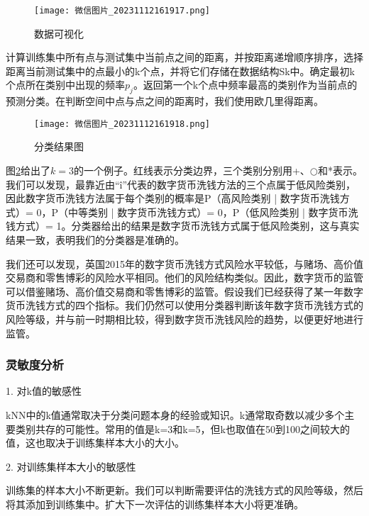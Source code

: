 \documentclass[withoutpreface,bwprint]{cumcmthesis} %
\begin{document}
\begin{figure}[htfp]  %
	\centering  %
	\label{pic3}
	\texttt{[image: 微信图片\_20231112161917.png]} %
	\caption{数据可视化} %
\end{figure}

计算训练集中所有点与测试集中当前点之间的距离，并按距离递增顺序排序，选择距离当前测试集中的点最小的k个点，并将它们存储在数据结构Sk中。确定最初k个点所在类别中出现的频率$p_j$。返回第一个k个点中频率最高的类别作为当前点的预测分类。在判断空间中点与点之间的距离时，我们使用欧几里得距离。

\begin{figure}[htfp]  %
	\centering  %
	\label{pic4}
	\texttt{[image: 微信图片\_20231112161918.png]} %
	\caption{分类结果图} %
\end{figure}

图\ref{pic4}给出了$k=3$的一个例子。红线表示分类边界，三个类别分别用+、$\bigcirc$和*表示。我们可以发现，最靠近由“î”代表的数字货币洗钱方法的三个点属于低风险类别，因此数字货币洗钱方法属于每个类别的概率是P（高风险类别 | 数字货币洗钱方式）= 0，P（中等类别 | 数字货币洗钱方式）= 0，P（低风险类别 | 数字货币洗钱方式）= 1。分类器给出的结果是数字货币洗钱方式属于低风险类别，这与真实结果一致，表明我们的分类器是准确的。

我们还可以发现，英国2015年的数字货币洗钱方式风险水平较低，与赌场、高价值交易商和零售博彩的风险水平相同。他们的风险结构类似。因此，数字货币的监管可以借鉴赌场、高价值交易商和零售博彩的监管。假设我们已经获得了某一年数字货币洗钱方式的四个指标。我们仍然可以使用分类器判断该年数字货币洗钱方式的风险等级，并与前一时期相比较，得到数字货币洗钱风险的趋势，以便更好地进行监管。

\subsubsection{灵敏度分析}
1. 对k值的敏感性

kNN中的k值通常取决于分类问题本身的经验或知识。k通常取奇数以减少多个主要类别共存的可能性。常用的值是k=3和k=5，但k也取值在50到100之间较大的值，这也取决于训练集样本大小的大小。

2. 对训练集样本大小的敏感性

训练集的样本大小不断更新。我们可以判断需要评估的洗钱方式的风险等级，然后将其添加到训练集中。扩大下一次评估的训练集样本大小将更准确。
\end{document}
